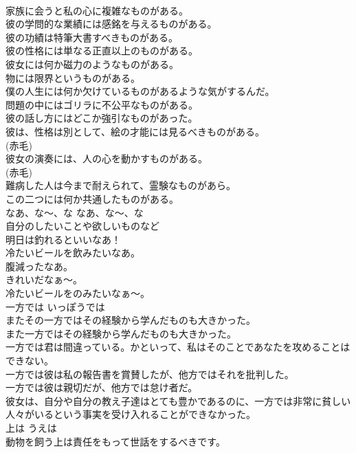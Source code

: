 \documentclass[8pt]{extreport}
\begin{document}
\begin{CJK}{UTF8}{min}
\\	家族に会うと私の心に複雑なものがある。  
\\	彼の学問的な業績には感銘を与えるものがある。   
\\	彼の功績は特筆大書すべきものがある。   
\\	彼の性格には単なる正直以上のものがある。   
\\	彼女には何か磁力のようなものがある。   
\\	物には限界というものがある。   
\\	僕の人生には何か欠けているものがあるような気がするんだ。   
\\	問題の中にはゴリラに不公平なものがある。   
\\	彼の話し方にはどこか強引なものがあった。  
\\	彼は、性格は別として、絵の才能には見るべきものがある。  
\\	(赤毛)
\\	彼女の演奏には、人の心を動かすものがある。  
\\	(赤毛)
\\	難病した人は今まで耐えられて、霊験なものがあら。  
\\	この二つには何か共通したものがある。  
\\	なあ、な〜、な	なあ、な〜、な	
\\	自分のしたいことや欲しいものなど	
\\	明日は釣れるといいなあ！  
\\	冷たいビールを飲みたいなあ。  
\\	腹減ったなあ。   
\\	きれいだなぁ〜。   
\\	冷たいビールをのみたいなぁ〜。  
\\	一方では	いっぽうでは	
\\	またその一方ではその経験から学んだものも大きかった。   
\\	また一方ではその経験から学んだものも大きかった。   
\\	一方では君は間違っている。かといって、私はそのことであなたを攻めることはできない。   
\\	一方では彼は私の報告書を賞賛したが、他方ではそれを批判した。  
\\	一方では彼は親切だが、他方では怠け者だ。   
\\	彼女は、自分や自分の教え子達はとても豊かであるのに、一方では非常に貧しい人々がいるという事実を受け入れることができなかった。   
\\	上は	うえは	
\\	動物を飼う上は責任をもって世話をするべきです。  

\end{CJK}
\end{document}
